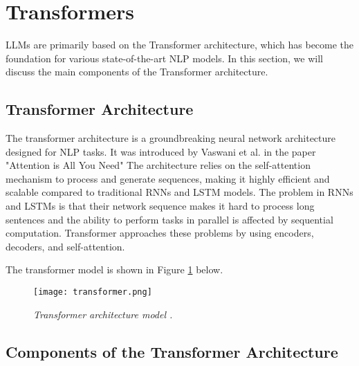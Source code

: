 \section{Transformers}

LLMs are primarily based on the Transformer architecture, which has become the foundation for various state-of-the-art NLP models. In this section, we will discuss the main components of the Transformer architecture.

\subsection{Transformer Architecture}

The transformer architecture is a groundbreaking neural network architecture designed for NLP tasks. It was introduced by Vaswani et al. in the paper "Attention is All You Need"\cite{vaswani2023attention} The architecture relies on the self-attention mechanism to process and generate sequences, making it highly efficient and scalable compared to traditional RNNs and LSTM models. The problem in RNNs and LSTMs is that their network sequence makes it hard to process long sentences and the ability to perform tasks in parallel is affected by sequential computation. Transformer approaches these problems by using encoders, decoders, and self-attention.

\noindent The transformer model is shown in Figure \ref{fig:transformer} below.

\begin{figure}[H]
    \centering
    \texttt{[image: transformer.png]}
    \caption{
        \it{Transformer architecture model \cite{vaswani2023attention}.}
    }
    \label{fig:transformer}
\end{figure}

\subsection{Components of the Transformer Architecture}

